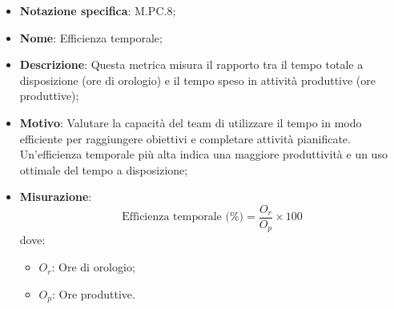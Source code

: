 \begin{itemize}
    \item \textbf{Notazione specifica}: M.PC.8;
    \item \textbf{Nome}: Efficienza temporale;
    \item \textbf{Descrizione}: Questa metrica misura il rapporto tra il tempo totale a disposizione (ore di orologio) e il tempo speso in attività produttive (ore produttive);
    \item \textbf{Motivo}: Valutare la capacità del team di utilizzare il tempo in modo efficiente per raggiungere obiettivi e completare attività pianificate. Un'efficienza temporale più alta indica una maggiore produttività e un uso ottimale del tempo a disposizione;
    \item \textbf{Misurazione}:
    \[
        \text{Efficienza temporale (\%)} =\frac{O_r}{O_p} \times 100
    \]
    dove:
    \begin{itemize}
        \item $O_{r}$: Ore di orologio;
        \item $O_{p}$: Ore produttive.
    \end{itemize}
\end{itemize}
